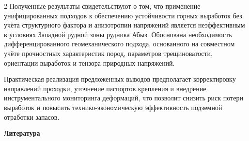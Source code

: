 \begin{multicols}{2}
Полученные результаты свидетельствуют о том, что применение
унифицированных подходов к обеспечению устойчивости горных выработок без
учёта структурного фактора и анизотропии напряжений является
неэффективным в условиях Западной рудной зоны рудника Абыз. Обоснована
необходимость дифференцированного геомеханического подхода, основанного
на совместном учёте прочностных характеристик пород, параметров
трещиноватости, ориентации выработок и тензора природных напряжений.

Практическая реализация предложенных выводов предполагает корректировку
направлений проходки, уточнение паспортов крепления и внедрение
инструментального мониторинга деформаций, что позволит снизить риск
потери выработок и повысить технико-экономическую эффективность
подземной отработки запасов.
\end{multicols}

\begin{center}
{\bfseries Литература}
\end{center}

